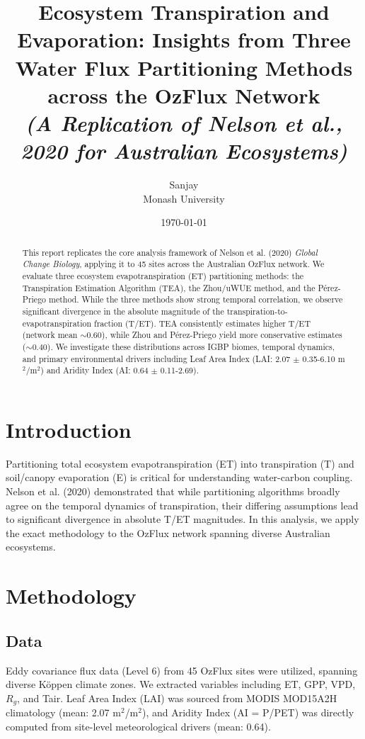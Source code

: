 \documentclass[11pt,a4paper]{article}
\title{\textbf{Ecosystem Transpiration and Evaporation: Insights from Three Water Flux Partitioning Methods across the OzFlux Network} \\
\large \textit{(A Replication of Nelson et al., 2020 for Australian Ecosystems)}}
\author{Sanjay \\ \small Monash University}
\date{\today}
\begin{document}
\maketitle

\begin{abstract}
This report replicates the core analysis framework of Nelson et al. (2020) \textit{Global Change Biology}, applying it to 45 sites across the Australian OzFlux network. We evaluate three ecosystem evapotranspiration (ET) partitioning methods: the Transpiration Estimation Algorithm (TEA), the Zhou/uWUE method, and the P\'erez-Priego method. While the three methods show strong temporal correlation, we observe significant divergence in the absolute magnitude of the transpiration-to-evapotranspiration fraction (T/ET). TEA consistently estimates higher T/ET (network mean $\sim0.60$), while Zhou and P\'erez-Priego yield more conservative estimates ($\sim0.40$). We investigate these distributions across IGBP biomes, temporal dynamics, and primary environmental drivers including Leaf Area Index (LAI: 2.07 $\pm$ 0.35-6.10 m$^2$/m$^2$) and Aridity Index (AI: 0.64 $\pm$ 0.11-2.69).
\end{abstract}

\section{Introduction}
Partitioning total ecosystem evapotranspiration (ET) into transpiration (T) and soil/canopy evaporation (E) is critical for understanding water-carbon coupling. Nelson et al. (2020) demonstrated that while partitioning algorithms broadly agree on the temporal dynamics of transpiration, their differing assumptions lead to significant divergence in absolute T/ET magnitudes. In this analysis, we apply the exact methodology to the OzFlux network spanning diverse Australian ecosystems.

\section{Methodology}
\subsection{Data}
Eddy covariance flux data (Level 6) from 45 OzFlux sites were utilized, spanning diverse K\"oppen climate zones. We extracted variables including ET, GPP, VPD, $R_g$, and Tair. Leaf Area Index (LAI) was sourced from MODIS MOD15A2H climatology (mean: 2.07 m$^2$/m$^2$), and Aridity Index (AI = P/PET) was directly computed from site-level meteorological drivers (mean: 0.64).
\end{document}
